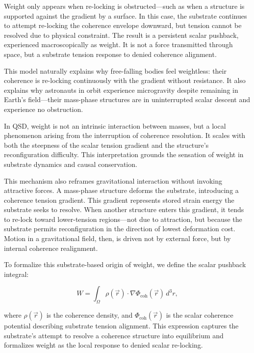 \documentclass[entropy,article,submit,pdftex,moreauthors]{Definitions/mdpi}
\begin{document}
Weight only appears when re-locking is obstructed—such as when a structure is supported against the gradient by a surface. In this case, the substrate continues to attempt re-locking the coherence envelope downward, but tension cannot be resolved due to physical constraint. The result is a persistent scalar pushback, experienced macroscopically as weight. It is not a force transmitted through space, but a substrate tension response to denied coherence alignment.

This model naturally explains why free-falling bodies feel weightless: their coherence is re-locking continuously with the gradient without resistance. It also explains why astronauts in orbit experience microgravity despite remaining in Earth’s field—their mass-phase structures are in uninterrupted scalar descent and experience no obstruction.

In QSD, weight is not an intrinsic interaction between masses, but a local phenomenon arising from the interruption of coherence resolution. It scales with both the steepness of the scalar tension gradient and the structure’s reconfiguration difficulty. This interpretation grounds the sensation of weight in substrate dynamics and causal conservation.

This mechanism also reframes gravitational interaction without invoking attractive forces. A mass-phase structure deforms the substrate, introducing a coherence tension gradient. This gradient represents stored strain energy the substrate seeks to resolve. When another structure enters this gradient, it tends to re-lock toward lower-tension regions—not due to attraction, but because the substrate permits reconfiguration in the direction of lowest deformation cost. Motion in a gravitational field, then, is driven not by external force, but by internal coherence realignment.

To formalize this substrate-based origin of weight, we define the scalar pushback integral:

\begin{equation}
    W = \int_{\Omega} \rho(\vec{r}) \cdot \nabla \Phi_{\text{coh}}(\vec{r}) \, d^3r,
\end{equation}

where \( \rho(\vec{r}) \) is the coherence density, and \( \Phi_{\text{coh}}(\vec{r}) \) is the scalar coherence potential describing substrate tension alignment. This expression captures the substrate’s attempt to resolve a coherence structure into equilibrium and formalizes weight as the local response to denied scalar re-locking.
\end{document}
